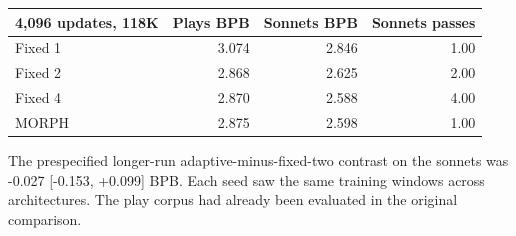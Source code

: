 \begin{center}\begin{tabular}{lrrr}\toprule
4,096 updates, 118K & Plays BPB & Sonnets BPB & Sonnets passes\\\midrule
Fixed 1 & 3.074 & 2.846 & 1.00\\
Fixed 2 & 2.868 & 2.625 & 2.00\\
Fixed 4 & 2.870 & 2.588 & 4.00\\
MORPH & 2.875 & 2.598 & 1.00\\
\bottomrule\end{tabular}\end{center}
The prespecified longer-run adaptive-minus-fixed-two contrast on the sonnets was -0.027 [-0.153, +0.099] BPB. Each seed saw the same training windows across architectures. The play corpus had already been evaluated in the original comparison.

